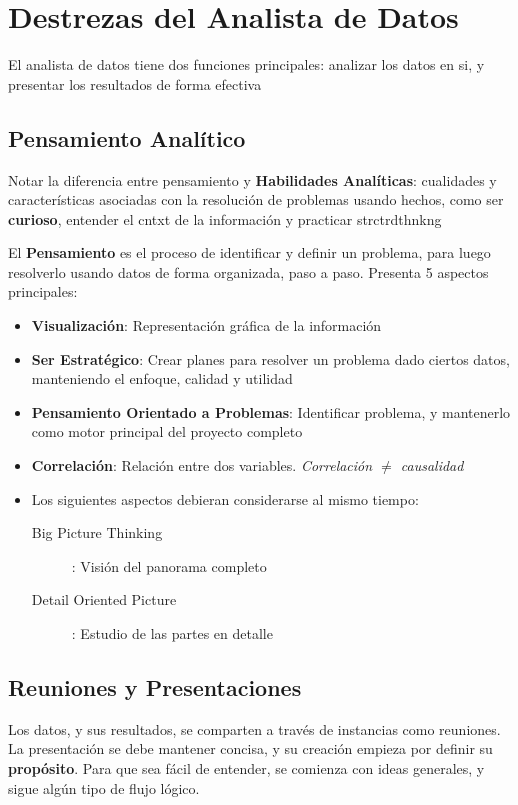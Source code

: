 
\section{Destrezas del Analista de Datos}
El analista de datos tiene dos funciones principales: analizar los datos en si, y presentar los resultados de forma efectiva

\subsection{Pensamiento Analítico}
Notar la diferencia entre pensamiento y \textbf{Habilidades Analíticas}: cualidades y características asociadas con la resolución de problemas usando hechos,  como ser \textbf{curioso}, entender el \gls{cntxt} de la información y practicar \gls{strctrdthnkng}

El \textbf{Pensamiento} es el proceso de identificar y definir un problema, para luego resolverlo usando datos de forma organizada, paso a paso. Presenta 5 aspectos principales:
\begin{itemize}
    \item{\textbf{Visualización}: Representación gráfica de la información}
    \item{\textbf{Ser Estratégico}: Crear planes para resolver un problema dado ciertos datos, manteniendo el enfoque, calidad y utilidad}
    \item{\textbf{Pensamiento Orientado a Problemas}: Identificar problema, y mantenerlo como motor principal del proyecto completo}
    \item{\textbf{Correlación}: Relación entre dos variables. \textit{Correlación ${\neq}$ causalidad}}
    \item{Los siguientes aspectos debieran considerarse al mismo tiempo:
    \begin{description}
        \item[Big Picture Thinking]: Visión del panorama completo
        \item[Detail Oriented Picture]: Estudio de las partes en detalle
    \end{description}}
\end{itemize}

\subsection{Reuniones y Presentaciones}
Los datos, y sus resultados, se comparten a través de instancias como reuniones. La presentación se debe mantener concisa, y su creación empieza por definir su \textbf{propósito}. Para que sea fácil de entender, se comienza con ideas generales, y sigue algún tipo de flujo lógico. 

